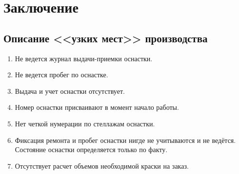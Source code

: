 \newpage

\chapter{Заключение}

\section{Описание <<узких мест>> производства}



\begin{enumerate}


\item 	Не ведется журнал выдачи-приемки оснастки.

\item 	Не ведется пробег по оснастке.

 \item  Выдача и учет оснастки отсутствует.
 
 \item  Номер оснастки присваивают в момент начало работы.
 
 \item  Нет четкой нумерации по стеллажам оснастки.

 \item Фиксация ремонта и пробег оснастки нигде не учитываются и не ведётся. Состояние оснастки определяется только по факту.
 
 \item  Отсутствует расчет объемов необходимой краски на заказ.
 





\end{enumerate}

